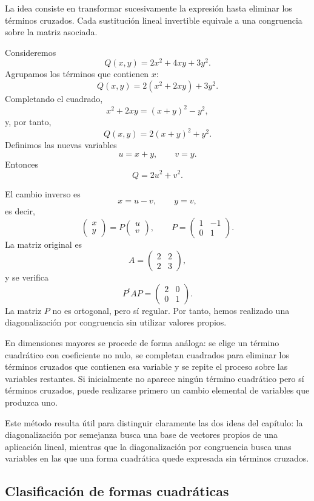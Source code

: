 La idea consiste en transformar sucesivamente la expresión hasta eliminar los términos cruzados. Cada sustitución lineal invertible equivale a una congruencia sobre la matriz asociada.

\begin{example}
Consideremos
\[
Q(x,y)=2x^2+4xy+3y^2.
\]
Agrupamos los términos que contienen $x$:
\[
Q(x,y)=2(x^2+2xy)+3y^2.
\]
Completando el cuadrado,
\[
x^2+2xy=(x+y)^2-y^2,
\]
y, por tanto,
\[
Q(x,y)=2(x+y)^2+y^2.
\]
Definimos las nuevas variables
\[
u=x+y,
\qquad
v=y.
\]
Entonces
\[
\boxed{Q=2u^2+v^2.}
\]

El cambio inverso es
\[
x=u-v,
\qquad
y=v,
\]
es decir,
\[
\begin{pmatrix}x\\y\end{pmatrix}
=
P\begin{pmatrix}u\\v\end{pmatrix},
\qquad
P=\begin{pmatrix}1&-1\\0&1\end{pmatrix}.
\]
La matriz original es
\[
A=\begin{pmatrix}2&2\\2&3\end{pmatrix},
\]
y se verifica
\[
P^tAP=
\begin{pmatrix}2&0\\0&1\end{pmatrix}.
\]
La matriz $P$ no es ortogonal, pero sí regular. Por tanto, hemos realizado una diagonalización por congruencia sin utilizar valores propios.
\end{example}

En dimensiones mayores se procede de forma análoga: se elige un término cuadrático con coeficiente no nulo, se completan cuadrados para eliminar los términos cruzados que contienen esa variable y se repite el proceso sobre las variables restantes. Si inicialmente no aparece ningún término cuadrático pero sí términos cruzados, puede realizarse primero un cambio elemental de variables que produzca uno.

Este método resulta útil para distinguir claramente las dos ideas del capítulo: la diagonalización por semejanza busca una base de vectores propios de una aplicación lineal, mientras que la diagonalización por congruencia busca unas variables en las que una forma cuadrática quede expresada sin términos cruzados.

\subsection{Clasificación de formas cuadráticas}


